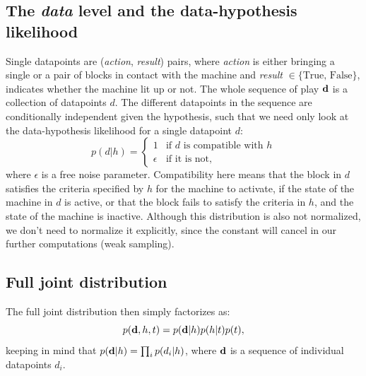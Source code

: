 \documentclass[11pt, a4paper]{article}
\begin{document}
\subsection*{The \emph{data} level and the data-hypothesis likelihood}
Single datapoints are (\emph{action}, \emph{result}) pairs, where \emph{action} is either bringing a single or a pair of blocks in contact with the machine and \emph{result} $\in\{ \textrm{True, False} \}$, indicates whether the machine lit up or not. The whole sequence of play $\textbf d$ is a collection of datapoints $d$. The different datapoints in the sequence are conditionally independent given the hypothesis, such that we need only look at the data-hypothesis likelihood for a single datapoint $d$:
\begin{equation}
p(d|h)= 
\begin{cases} 
1  & \textrm{if $d$ is compatible with  $h$} \\
\epsilon &  \textrm{if it is not},
\end{cases}
\end{equation}
where $\epsilon$ is a free noise parameter. Compatibility here means that the block in $d$ satisfies the criteria specified by $h$ for the machine to activate, if the state of the machine in $d$ is active, or that the block fails to satisfy the criteria in $h$, and the state of the machine is inactive. Although this distribution is also not normalized, we don't need to normalize it explicitly, since the constant will cancel in our further computations (weak sampling). 
 
\subsection*{Full joint distribution}
The full joint distribution then simply factorizes as:
\begin{equation}
p(\textbf d,h,t)=p(\textbf d |h)p(h|t)p(t),
\end{equation}
keeping in mind that $p(\textbf d |h)=\prod_i p(d_i |h)$, where $\textbf d$ is a sequence of individual datapoints $d_i$.
 
\end{document}
